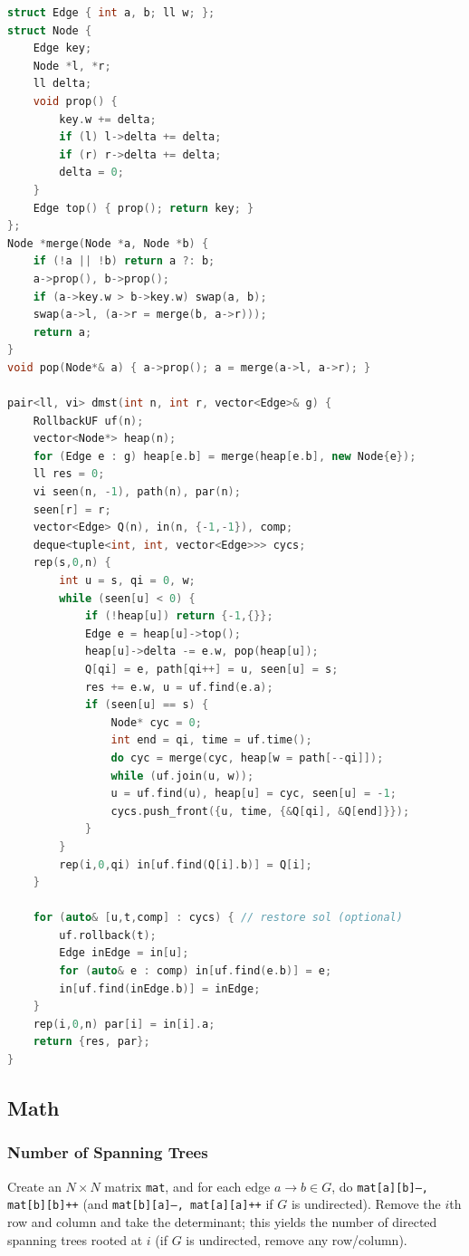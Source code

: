 \begin{multicols}{\Columns}
\begin{lstlisting}[language=C++]
struct Edge { int a, b; ll w; };
struct Node {
	Edge key;
	Node *l, *r;
	ll delta;
	void prop() {
		key.w += delta;
		if (l) l->delta += delta;
		if (r) r->delta += delta;
		delta = 0;
	}
	Edge top() { prop(); return key; }
};
Node *merge(Node *a, Node *b) {
	if (!a || !b) return a ?: b;
	a->prop(), b->prop();
	if (a->key.w > b->key.w) swap(a, b);
	swap(a->l, (a->r = merge(b, a->r)));
	return a;
}
void pop(Node*& a) { a->prop(); a = merge(a->l, a->r); }

pair<ll, vi> dmst(int n, int r, vector<Edge>& g) {
	RollbackUF uf(n);
	vector<Node*> heap(n);
	for (Edge e : g) heap[e.b] = merge(heap[e.b], new Node{e});
	ll res = 0;
	vi seen(n, -1), path(n), par(n);
	seen[r] = r;
	vector<Edge> Q(n), in(n, {-1,-1}), comp;
	deque<tuple<int, int, vector<Edge>>> cycs;
	rep(s,0,n) {
		int u = s, qi = 0, w;
		while (seen[u] < 0) {
			if (!heap[u]) return {-1,{}};
			Edge e = heap[u]->top();
			heap[u]->delta -= e.w, pop(heap[u]);
			Q[qi] = e, path[qi++] = u, seen[u] = s;
			res += e.w, u = uf.find(e.a);
			if (seen[u] == s) {
				Node* cyc = 0;
				int end = qi, time = uf.time();
				do cyc = merge(cyc, heap[w = path[--qi]]);
				while (uf.join(u, w));
				u = uf.find(u), heap[u] = cyc, seen[u] = -1;
				cycs.push_front({u, time, {&Q[qi], &Q[end]}});
			}
		}
		rep(i,0,qi) in[uf.find(Q[i].b)] = Q[i];
	}

	for (auto& [u,t,comp] : cycs) { // restore sol (optional)
		uf.rollback(t);
		Edge inEdge = in[u];
		for (auto& e : comp) in[uf.find(e.b)] = e;
		in[uf.find(inEdge.b)] = inEdge;
	}
	rep(i,0,n) par[i] = in[i].a;
	return {res, par};
}
\end{lstlisting}


\subsection{Math}
	\subsubsection{Number of Spanning Trees}
		Create an $N\times N$ matrix \texttt{mat}, and for each edge $a \rightarrow b \in G$, do
		\texttt{mat[a][b]--, mat[b][b]++} (and \texttt{mat[b][a]--, mat[a][a]++} if $G$ is undirected).
		Remove the $i$th row and column and take the determinant; this yields the number of directed spanning trees rooted at $i$
		(if $G$ is undirected, remove any row/column).


\end{multicols}
